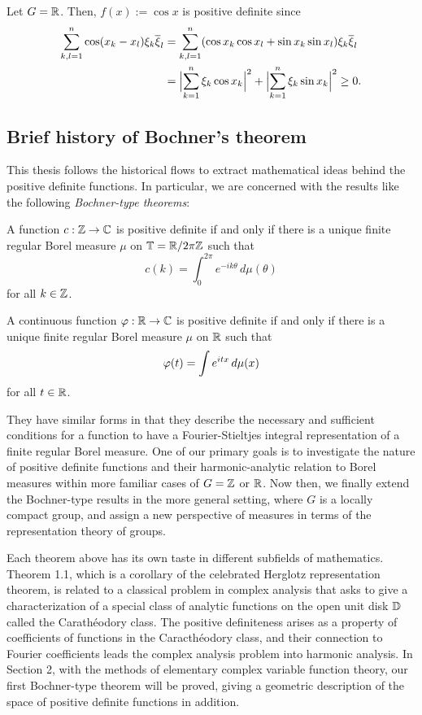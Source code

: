 \documentclass[a4paper]{article}
\begin{document}
\begin{ex}
Let $G=\R$.
Then, $f(x):=\cos x$ is positive definite since
\begin{align*}
\sum_{k,l=1}^n\cos(x_k-x_l)\xi_k\bar\xi_l
&=\sum_{k,l=1}^n(\cos x_k\cos x_l+\sin x_k\sin x_l)\xi_k\bar\xi_l\\
&=\Bigl|\sum_{k=1}^n\xi_k\cos x_k\Bigr|^2+\Bigl|\sum_{k=1}^n\xi_k\sin x_k\Bigr|^2\ge0.
\end{align*}
\end{ex}


\subsection{Brief history of Bochner's theorem}

This thesis follows the historical flows to extract mathematical ideas behind the positive definite functions.
In particular, we are concerned with the results like the following \emph{Bochner-type theorems}:
\begin{thm}
A function $c:\Z\to\C$ is positive definite if and only if there is a unique finite regular Borel measure $\mu$ on $\T=\R/2\pi\Z$ such that
\[c(k)=\int_0^{2\pi}e^{-ik\theta}\,d\mu(\theta)\]
for all $k\in\Z$.
\end{thm}
\begin{thm}
A continuous function $\f:\R\to\C$ is positive definite if and only if there is a unique finite regular Borel measure $\mu$ on $\R$ such that
\[\f(t)=\int e^{itx}\,d\mu(x)\]
for all $t\in\R$.
\end{thm}
They have similar forms in that they describe the necessary and sufficient conditions for a function to have a Fourier-Stieltjes integral representation of a finite regular Borel measure.
One of our primary goals is to investigate the nature of positive definite functions and their harmonic-analytic relation to Borel measures within more familiar cases of $G=\Z$ or $\R$.
Now then, we finally extend the Bochner-type results in the more general setting, where $G$ is a locally compact group, and assign a new perspective of measures in terms of the representation theory of groups.

Each theorem above has its own taste in different subfields of mathematics.
Theorem 1.1, which is a corollary of the celebrated Herglotz representation theorem, is related to a classical problem in complex analysis that asks to give a characterization of a special class of analytic functions on the open unit disk $\D$ called the Carath\'eodory class.
The positive definiteness arises as a property of coefficients of functions in the Caracth\'eodory class, and their connection to Fourier coefficients leads the complex analysis problem into harmonic analysis.
In Section 2, with the methods of elementary complex variable function theory, our first Bochner-type theorem will be proved, giving a geometric description of the space of positive definite functions in addition.
\end{document}
